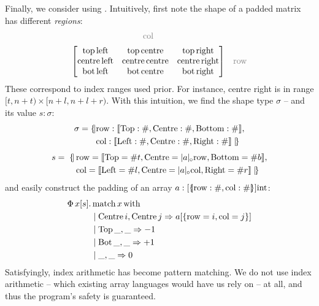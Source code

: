 \needspace{3em}
\noindent
Finally, we consider using \starr{}. Intuitively, first note the shape of a padded matrix has different \textit{regions}: \\[-0.5em]
$$
\begin{matrix}
{\color{gray} \mathrm{col}} & \\[0.5em]
\begin{bmatrix}
\mathrm{top\, left} & \mathrm{top\, centre} & \mathrm{top\, right} \\
\mathrm{centre\, left} & \mathrm{centre\, centre} & \mathrm{centre\, right} \\
\mathrm{bot\, left} & \mathrm{bot\, centre} & \mathrm{bot\, right} \\
\end{bmatrix} & {\color{gray} \mathrm{row}} 
\end{matrix} $$
These correspond to index ranges used prior. For instance, centre right is in range $[t, n + t) \times [n + l, n + l + r)$.
With this intuition, we find the \starr{} shape type $\sigma$ -- and its value $s : \sigma$:
\begin{align*}
\sigma =  \{\!\mid  &\mathrm{row}: \sconcattype{\mathrm{Top}: \ssized, \mathrm{Centre}: \ssized,\mathrm{Bottom}: \ssized}, \\ 
&\mathrm{col} : \sconcattype{\mathrm{Left}: \ssized, \mathrm{Centre}: \ssized,\mathrm{Right}: \ssized} \mid\!\} 
\end{align*}
\vspace{-2em}
\begin{align*}
s =\; \{\!\mid &\,\mathrm{row}= \sconcatval{\mathrm{Top}= \ssize t, \mathrm{Centre}= \sproductproj{\sshape{a}}{\mathrm{row}}, \mathrm{Bottom}= \ssize b}, \\ 
&\,\mathrm{col}= \sconcatval{ \mathrm{Left}= \ssize l, \mathrm{Centre}= \sproductproj{\sshape{a}}{\mathrm{col}}, \mathrm{Right}= \ssize r} \mid\!\}
\end{align*}
and easily construct the padding of an array $a : [\sproducttype{\mathrm{row} : \ssized,\mathrm{col} : \ssized }] \mathrm{int} $:
\begin{align*}
\Phi\, x[s] \ldotp&\, \mathrm{match}\,x\,\mathrm{with} \\
&\mid \mathrm{Centre}\,i, \mathrm{Centre}\,j \Rightarrow a[\srecordval{ \mathrm{row}= i, \mathrm{col}= j }] \\
&\mid \mathrm{Top}\,\_, \_ \Rightarrow -1 \\
&\mid \mathrm{Bot}\,\_, \_ \Rightarrow +1  \\
&\mid \_, \_ \Rightarrow 0
\end{align*}
Satisfyingly, index arithmetic has become pattern matching. We do not use index arithmetic -- which existing array languages would have us rely on -- at all, and thus the program's safety is guaranteed.

